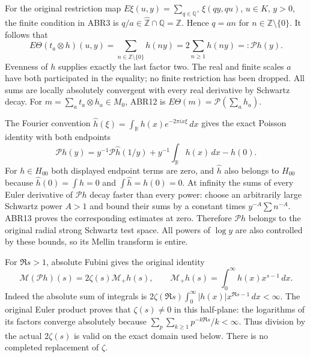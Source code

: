 \documentclass[11pt]{article}
\begin{document}
For the original restriction map
$E\xi(u,y)=\sum_{q\in\mathbb Q^\times}\xi(qy,qu)$,
$u\in K$, $y>0$, the finite condition in ABR3 is
$q/a\in\widehat{\mathbb Z}\cap\mathbb Q=\mathbb Z$.
Hence $q=an$ for $n\in\mathbb Z\setminus\{0\}$. It follows that
\begin{equation}\tag{ABR12}
 E\Theta(t_a\otimes h)(u,y)
    =\sum_{n\in\mathbb Z\setminus\{0\}}h(ny)
    =2\sum_{n\ge1}h(ny)=:\mathcal P h(y).
\end{equation}
Evenness of $h$ supplies exactly the last factor two. The real
and finite scales $a$ have both participated in the equality;
no finite restriction has been dropped. All sums are locally
absolutely convergent with every real derivative by Schwartz decay.
For $m=\sum_at_a\otimes h_a\in M_0$, ABR12 is
$E\Theta(m)=\mathcal P(\sum_a h_a)$.

The Fourier convention
$\widehat h(\xi)=\int_{\mathbb R}h(x)e^{-2\pi ix\xi}\,dx$
gives the exact Poisson identity with both endpoints
\begin{equation}\tag{ABR13}
 \mathcal P h(y)
 =y^{-1}\mathcal P\widehat h(1/y)
     +y^{-1}\int_{\mathbb R}h(x)\,dx-h(0).
\end{equation}
For $h\in H_{00}$ both displayed endpoint terms are zero, and
$\widehat h$ also belongs to $H_{00}$ because
$\widehat h(0)=\int h=0$ and $\int\widehat h=h(0)=0$.
At infinity the sums of every Euler derivative of $\mathcal P h$
decay faster than every power: choose an arbitrarily large Schwartz
power $A>1$ and bound their sums by a constant times
$y^{-A}\sum n^{-A}$. ABR13 proves the corresponding estimates
at zero. Therefore $\mathcal P h$ belongs to the original radial
strong Schwartz test space. All powers of $\log y$ are also
controlled by these bounds, so its Mellin transform is entire.

For $\Re s>1$, absolute Fubini gives the original identity
\begin{equation}\tag{ABR14}
 \mathcal M(\mathcal P h)(s)
   =2\zeta(s)\mathcal M_+h(s),\qquad
 \mathcal M_+h(s)=\int_0^\infty h(x)x^{s-1}\,dx.
\end{equation}
Indeed the absolute sum of integrals is
$2\zeta(\Re s)\int_0^\infty|h(x)|x^{\Re s-1}\,dx<\infty$.
The original Euler product proves that $\zeta(s)\ne0$ in this
half-plane: the logarithms of its factors converge absolutely
because $\sum_p\sum_{k\ge1}p^{-k\Re s}/k<\infty$.
Thus division by the actual $2\zeta(s)$ is valid on the exact
domain used below. There is no completed replacement of $\zeta$.
\end{document}
